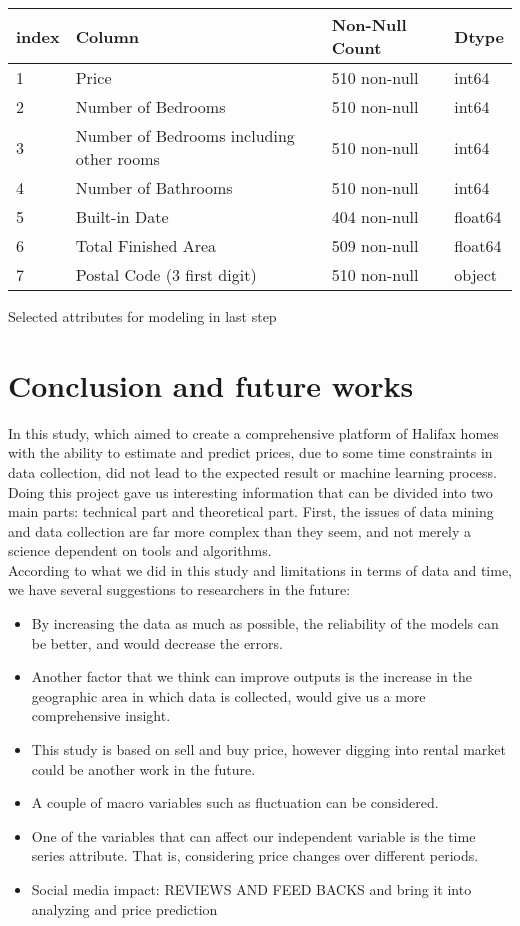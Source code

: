 \documentclass{article}
\begin{document}
\begin{center}
    \begin{tabular}{ | m{2em} | m{5cm}| m{2.5cm} | m{2cm} |} 
        \hline
        index &  Column & Non-Null Count & Dtype \\ 
        \hline
        1 &  Price   &            510 non-null &   int64  \\ 
        2  & Number of Bedrooms     &       510 non-null  &  int64   \\ 
        3 & Number of Bedrooms including other rooms &      510 non-null &   int64  \\
         4  & Number of Bathrooms      &     510 non-null  &  int64  \\
         5 & Built-in Date         &   404 non-null   & float64\\
         6 & Total Finished Area  & 509 non-null  &  float64\\
         7 & Postal Code (3 first digit) &  510 non-null   & object \\
         \hline
    \end{tabular}
    \caption{Selected attributes for modeling in last step}
\end{center}
\section{Conclusion and future works}
In this study, which aimed to create a comprehensive platform of Halifax homes with the ability to estimate and predict prices, due to some time constraints in data collection, did not lead to the expected result or machine learning process.\\

Doing this project gave us interesting information that can be divided into two main parts: technical part and theoretical part. First, the issues of data mining and data collection are far more complex than they seem, and not merely a science dependent on tools and algorithms.\\

According to what we did in this study and limitations in terms of data and time, we have several suggestions to researchers in the future:
\begin{itemize}
    \item By increasing the data as much as possible, the reliability of the models can be better, and would decrease the errors.
    \item Another factor that we think can improve outputs is the increase in the geographic area in which data is collected, would give us a more comprehensive insight.
    \item This study is based on sell and buy price, however digging into rental market could be another work in the future.
    \item A couple of macro variables such as fluctuation can be considered.
    \item One of the variables that can affect our independent variable is the time series attribute. That is, considering price changes over different periods.
    \item Social media impact: REVIEWS AND FEED BACKS and bring it into analyzing and price prediction
\end{itemize}
\end{document}
